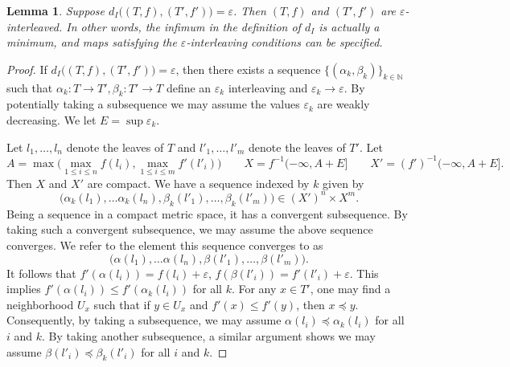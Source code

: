 \documentclass{article}
\newtheorem{lemma}[theorem]{Lemma}
\theoremstyle{definition}
\renewcommand{\epsilon}{\varepsilon}
\begin{document}
\begin{lemma}
    \label{lem:infint}
    Suppose $d_I\big((T,f),(T',f')\big) = \epsilon$. Then $(T,f)$ and $(T',f')$ are $\epsilon$-interleaved. In other words, the infimum in the definition of $d_I$ is actually a minimum, and maps satisfying the $\epsilon$-interleaving conditions can be specified.
\end{lemma}

\begin{proof}
    If $d_I\big((T,f),(T',f')\big) = \epsilon$, then there exists a sequence $\{(\alpha_k,\beta_k)\}_{k\in \mathbb{N}}$ such that $\alpha_k:T\to T', \beta_k:T'\to T$ define an $\epsilon_k$ interleaving and $\epsilon_k \to \epsilon$. By potentially taking a subsequence we may assume the values $\epsilon_k$ are weakly decreasing. We let $E = \sup\epsilon_k$.

    Let $l_1,\ldots,l_n$ denote the leaves of $T$ and $l'_1,\ldots,l'_m$ denote the leaves of $T'$. Let
    \begin{equation*}
        A = \max\big(\max_{1\leq i\leq n} f(l_i), \max_{1 \leq i\leq m}f'(l'_i)\big) \qquad X = f^{-1}(-\infty,A+E] \qquad X' = (f')^{-1}(-\infty, A+E].
    \end{equation*}
    Then $X$ and $X'$ are compact. We have a sequence indexed by $k$ given by
    \begin{equation*}
        \big(\alpha_k(l_1), \ldots\alpha_k(l_n), \beta_k(l'_1),\ldots,\beta_k(l'_m)\big) \in (X')^n\times X^m.
    \end{equation*}
    Being a sequence in a compact metric space, it has a convergent subsequence. By taking such a convergent subsequence, we may assume the above sequence converges. We refer to the element this sequence converges to as
    \begin{equation*}
         \big(\alpha(l_1), \ldots\alpha(l_n), \beta(l'_1),\ldots,\beta(l'_m)\big).
    \end{equation*}
    It follows that $f'(\alpha(l_i)) = f(l_i) + \epsilon$, $f(\beta(l'_i)) = f'(l'_i) + \epsilon$. This implies $f'(\alpha(l_i)) \leq f'(\alpha_k(l_i))$ for all $k$. For any $x \in T'$, one may find a neighborhood $U_x$ such that if $y \in U_x$ and $f'(x) \leq f'(y)$, then $x \preceq y$. Consequently, by taking a subsequence, we may assume $\alpha(l_i) \preceq \alpha_k(l_i)$ for all $i$ and $k$. By taking another subsequence, a similar argument shows we may assume $\beta(l'_i) \preceq \beta_k(l'_i)$ for all $i$ and $k$.


\end{proof}
\end{document}
